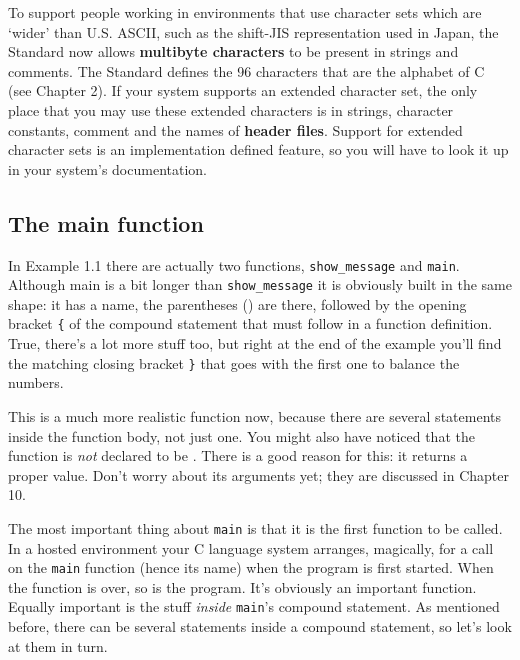    To support people working in environments that use character sets which
    are `wider' than U.S. ASCII, such as the shift-JIS representation
    used in Japan, the Standard now allows \textbf{multibyte characters} to
    be present in strings and comments. The Standard defines the
    96 characters that are the alphabet of C (see Chapter 2). If your system supports an extended character set, the only
    place that you may use these extended characters is in strings, character
    constants, comment and the names of \textbf{header files}. Support for
    extended character sets is an implementation defined feature, so you will
    have to look it up in your system's documentation.


  

  \subsection{The main function}
   

   In Example 1.1 there are actually two functions,
    \texttt{show\_message} and \texttt{main}. Although main is a bit
    longer than \texttt{show\_message} it is obviously built in the same
    shape: it has a name, the parentheses () are there, followed by the opening
    bracket \texttt{\{} of the compound statement that must follow in a
    function definition. True, there's a lot more stuff too, but right at the
    end of the example you'll find the matching closing bracket \texttt{\}}
    that goes with the first one to balance the numbers.


   This is a much more realistic function now, because there are several
    statements inside the function body, not just one. You might also have
    noticed that the function is \textit{not} declared to be
    \void. There is a good reason for this: it returns a proper
    value. Don't worry about its arguments yet; they are discussed in
    Chapter 10.


   The most important thing about \texttt{main} is that it is the first
    function to be called. In a hosted environment your C language system
    arranges, magically, for a call on the \texttt{main} function (hence
    its name) when the program is first started. When the function is over, so
    is the program. It's obviously an important function. Equally important is
    the stuff \textit{inside} \texttt{main}'s compound statement. As
    mentioned before, there can be several statements inside a compound
    statement, so let's look at them in turn.


